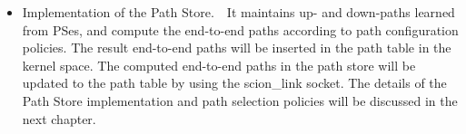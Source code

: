 \begin{itemize}
\item{Implementation of the Path Store.}\ \ It maintains up- and
down-paths learned from PSes, and compute the end-to-end paths
according to path configuration policies. The result end-to-end
paths will be inserted in the path table in the kernel space. %
The computed end-to-end paths in the path store will be updated to
the path table by using the scion\_link socket. The details of the
Path Store implementation and path selection policies will be
discussed in the next chapter.

\end{itemize}

